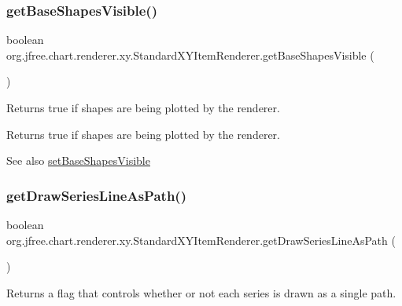 \subsubsection{\texorpdfstring{get\+Base\+Shapes\+Visible()}{getBaseShapesVisible()}}
{\footnotesize\ttfamily boolean org.\+jfree.\+chart.\+renderer.\+xy.\+Standard\+X\+Y\+Item\+Renderer.\+get\+Base\+Shapes\+Visible (\begin{DoxyParamCaption}{ }\end{DoxyParamCaption})}

Returns true if shapes are being plotted by the renderer.

\begin{DoxyReturn}{Returns}
{\ttfamily true} if shapes are being plotted by the renderer.
\end{DoxyReturn}
\begin{DoxySeeAlso}{See also}
\mbox{\hyperlink{classorg_1_1jfree_1_1chart_1_1renderer_1_1xy_1_1_standard_x_y_item_renderer_a6bf86f870ebd05fcf10790431c04f29f}{set\+Base\+Shapes\+Visible}} 
\end{DoxySeeAlso}
\mbox{\label{classorg_1_1jfree_1_1chart_1_1renderer_1_1xy_1_1_standard_x_y_item_renderer_adb0d35a07a330dd01f8e391943e97fef}} 
\subsubsection{\texorpdfstring{get\+Draw\+Series\+Line\+As\+Path()}{getDrawSeriesLineAsPath()}}
{\footnotesize\ttfamily boolean org.\+jfree.\+chart.\+renderer.\+xy.\+Standard\+X\+Y\+Item\+Renderer.\+get\+Draw\+Series\+Line\+As\+Path (\begin{DoxyParamCaption}{ }\end{DoxyParamCaption})}

Returns a flag that controls whether or not each series is drawn as a single path.

